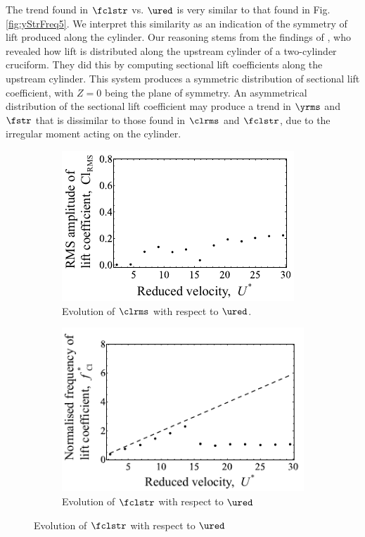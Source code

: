 \documentclass[a4paper,fleqn]{cas-sc}
\begin{document}
The trend found in $\fclstr$ vs. $\ured$ is very similar to that found in Fig. \ref{fig:yStrFreq5}. We interpret this similarity as an indication of the symmetry of lift produced along the cylinder. Our reasoning stems from the findings of \citet{Zhao2018a}, who revealed how lift is distributed along the upstream cylinder of a two-cylinder \angfi{} cruciform. They did this by computing sectional lift coefficients along the upstream cylinder. This system produces a symmetric distribution of sectional lift coefficient, with $Z = 0$ being the plane of symmetry. An asymmetrical distribution of the sectional lift coefficient may produce a trend in $\yrms$ and $\fstr$ that is dissimilar to those found in $\clrms$ and $\fclstr$, due to the irregular moment acting on the cylinder.

\begin{figure}
  \centering
  \begin{subfigure}[h]{0.38\textwidth}
    \includegraphics[width=\textwidth]{figs/clRMS5}
    \caption{Evolution of $\clrms$ with respect to $\ured$.}
    \label{fig:clRMS5}
  \end{subfigure}
  \hspace{6mm}
  \begin{subfigure}[h]{0.38\textwidth}
    \includegraphics[width=\textwidth]{figs/clFreq5}
    \caption{Evolution of $\fclstr$ with respect to $\ured$}
    \label{fig:clFreq5}
  \end{subfigure}


\end{figure}
\end{document}
